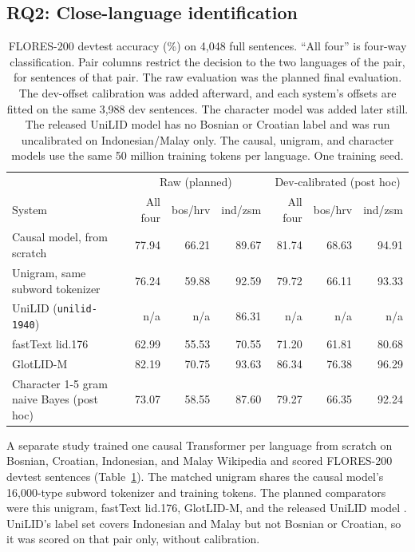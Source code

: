 \documentclass[11pt]{article}
\begin{document}
\subsection{RQ2: Close-language identification}

\begin{table}[t]
\centering
\small
\begin{tabular}{lrrrrrr}
\toprule
 & \multicolumn{3}{c}{Raw (planned)} & \multicolumn{3}{c}{Dev-calibrated (post hoc)} \\
System & All four & bos/hrv & ind/zsm & All four & bos/hrv & ind/zsm \\
\midrule
Causal model, from scratch & 77.94 & 66.21 & 89.67 & 81.74 & 68.63 & 94.91 \\
Unigram, same subword tokenizer & 76.24 & 59.88 & 92.59 & 79.72 & 66.11 & 93.33 \\
UniLID (\texttt{unilid-1940}) & n/a & n/a & 86.31 & n/a & n/a & n/a \\
fastText lid.176 & 62.99 & 55.53 & 70.55 & 71.20 & 61.81 & 80.68 \\
GlotLID-M & 82.19 & 70.75 & 93.63 & 86.34 & 76.38 & 96.29 \\
\midrule
Character 1-5 gram naive Bayes (post hoc) & 73.07 & 58.55 & 87.60 & 79.27 & 66.35 & 92.24 \\
\bottomrule
\end{tabular}
\caption{FLORES-200 devtest accuracy (\%) on 4,048 full sentences. ``All four''
is four-way classification. Pair columns restrict the decision to the two
languages of the pair, for sentences of that pair. The raw evaluation was the
planned final evaluation. The dev-offset calibration was added afterward, and
each system's offsets are fitted on the same 3,988 dev sentences. The
character model was added later still. The released UniLID model has no
Bosnian or Croatian label and was run uncalibrated on Indonesian/Malay only.
The causal, unigram, and character models use the same 50 million training
tokens per language. One training seed.}
\label{tab:lid}
\end{table}

A separate study trained one causal Transformer per language from scratch on
Bosnian, Croatian, Indonesian, and Malay Wikipedia \citep{wikimedia2023} and
scored FLORES-200 devtest sentences \citep{nllb2022} (Table~\ref{tab:lid}).
The matched unigram shares the causal model's 16,000-type subword tokenizer
and training tokens. The planned comparators were this unigram, fastText
lid.176, GlotLID-M, and the released UniLID model
\citep{meister2026unilid}. UniLID's label set covers Indonesian and Malay but
not Bosnian or Croatian, so it was scored on that pair only, without
calibration.
\end{document}
